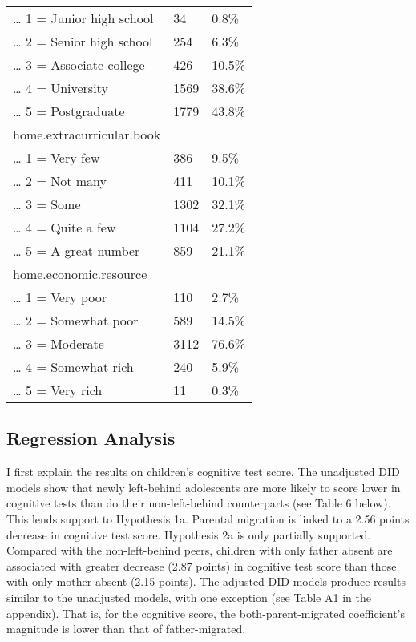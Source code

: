 \documentclass[
  man,floatsintext]{apa7}
\begin{document}
\begin{longtable}[]{@{}lll@{}}
\ldots{} 1 = Junior high school & 34 & 0.8\% \\
\ldots{} 2 = Senior high school & 254 & 6.3\% \\
\ldots{} 3 = Associate college & 426 & 10.5\% \\
\ldots{} 4 = University & 1569 & 38.6\% \\
\ldots{} 5 = Postgraduate & 1779 & 43.8\% \\
home.extracurricular.book & & \\
\ldots{} 1 = Very few & 386 & 9.5\% \\
\ldots{} 2 = Not many & 411 & 10.1\% \\
\ldots{} 3 = Some & 1302 & 32.1\% \\
\ldots{} 4 = Quite a few & 1104 & 27.2\% \\
\ldots{} 5 = A great number & 859 & 21.1\% \\
home.economic.resource & & \\
\ldots{} 1 = Very poor & 110 & 2.7\% \\
\ldots{} 2 = Somewhat poor & 589 & 14.5\% \\
\ldots{} 3 = Moderate & 3112 & 76.6\% \\
\ldots{} 4 = Somewhat rich & 240 & 5.9\% \\
\ldots{} 5 = Very rich & 11 & 0.3\% \\
\bottomrule()
\end{longtable}

\newpage

\hypertarget{regression-analysis}{%
\subsection{Regression Analysis}\label{regression-analysis}}

I first explain the results on children's cognitive test score. The unadjusted DID models show that newly left-behind adolescents are more likely to score lower in cognitive tests than do their non-left-behind counterparts (see Table 6 below). This lends support to Hypothesis 1a. Parental migration is linked to a 2.56 points decrease in cognitive test score. Hypothesis 2a is only partially supported. Compared with the non-left-behind peers, children with only father absent are associated with greater decrease (2.87 points) in cognitive test score than those with only mother absent (2.15 points). The adjusted DID models produce results similar to the unadjusted models, with one exception (see Table A1 in the appendix). That is, for the cognitive score, the both-parent-migrated coefficient's magnitude is lower than that of father-migrated.
\end{document}

